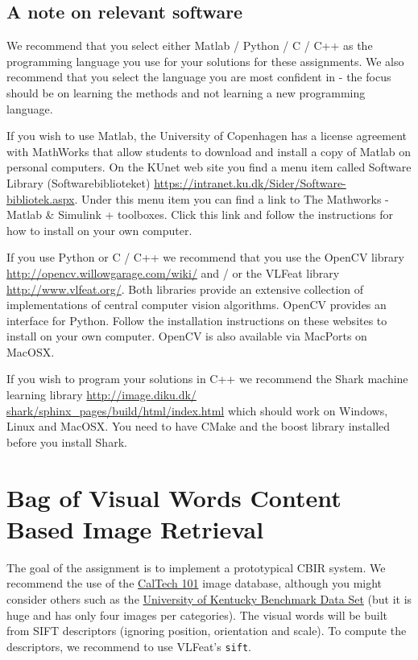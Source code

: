 \documentclass[a4paper,12pts]{article}
\begin{document}
\subsection*{A note on relevant software}
We recommend that you select either Matlab / Python / C / C++ as the programming language
you use for your solutions for these assignments. We also recommend that you select the
language you are most confident in - the focus should be on learning the methods and not
learning a new programming language.

If you wish to use Matlab, the University of Copenhagen has a license agreement with
MathWorks that allow students to download and install a copy of Matlab on personal
computers. On the KUnet web site you find a menu item called Software Library
(Softwarebiblioteket) \url{https://intranet.ku.dk/Sider/Software-bibliotek.aspx}. Under
this menu item you can find a link to The Mathworks - Matlab \& Simulink +
toolboxes. Click this link and follow the instructions for how to install on your own
computer.

If you use Python or C / C++ we recommend that you use the OpenCV library
\url{http://opencv.willowgarage.com/wiki/} and / or the VLFeat library
\url{http://www.vlfeat.org/}. Both libraries provide an extensive collection of
implementations of central computer vision algorithms. OpenCV provides an interface for
Python. Follow the installation instructions on these websites to install on your own
computer. OpenCV is also available via MacPorts on Mac\-OSX.

If you wish to program your solutions in C++ we recommend the Shark machine learning
library \url{http://image.diku.dk/ shark/sphinx_pages/build/html/index.html} which should
work on Windows, Linux and MacOSX. You need to have CMake and the boost library installed
before you install Shark.

\section*{Bag of Visual Words Content Based Image Retrieval}

The goal of the assignment is to implement a prototypical CBIR
system. We recommend the use of the
\href{http://www.vision.caltech.edu/Image_Datasets/Caltech101}{CalTech
  101} image database, although you might consider others such as the
\href{http://www.vis.uky.edu/~stewe/ukbench}{University of Kentucky
  Benchmark Data Set} (but it is huge and has only four images per
categories).  The visual words will be built from SIFT descriptors
(ignoring position, orientation and scale). To compute the
descriptors, we recommend to use VLFeat's \texttt{sift}.
\end{document}
